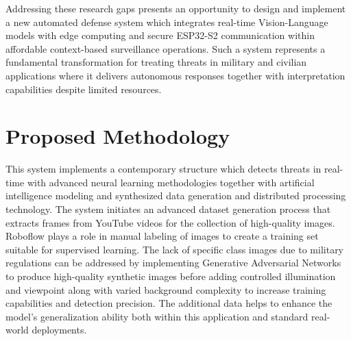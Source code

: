 \documentclass[fleqn,10pt,lineno]{wlpeerj}
\begin{document}
Addressing these research gaps presents an opportunity to design and implement a new automated defense system which integrates real-time Vision-Language models with edge computing and secure ESP32-S2 communication within affordable context-based surveillance operations. Such a system represents a fundamental transformation for treating threats in military and civilian applications where it delivers autonomous responses together with interpretation capabilities despite limited resources.




\section{Proposed Methodology}

This system implements a contemporary structure which detects threats in real-time with advanced neural learning methodologies together with artificial intelligence modeling and synthesized data generation and distributed processing technology. The system initiates an advanced dataset generation process that extracts frames from YouTube videos for the collection of high-quality images. Roboflow plays a role in manual labeling of images to create a training set suitable for supervised learning. The lack of specific class images due to military regulations can be addressed by implementing Generative Adversarial Networks to produce high-quality synthetic images before adding controlled illumination and viewpoint along with varied background complexity to increase training capabilities and detection precision. The additional data helps to enhance the model's generalization ability both within this application and standard real-world deployments.  
\end{document}
